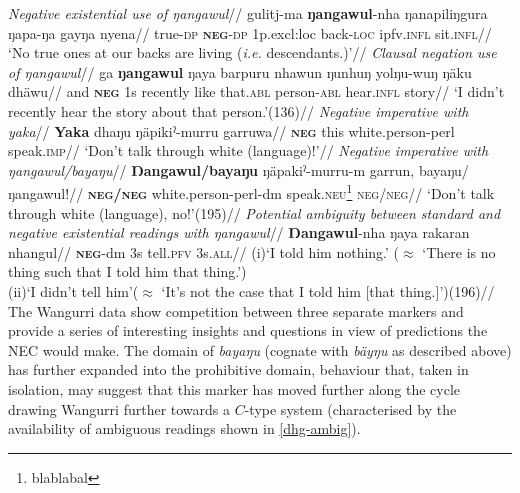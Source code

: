 \documentclass[usenames,dvipsnames,11pt]{article}
\begin{document}
{\pex\a\begingl\glpreamble \textit{Negative existential use of {\em ŋangawul}}//
\gla gulitj-ma \textbf{ŋangawul}-nha ŋanapiliŋgura ŋapa-ŋa gayŋa nyena//
\glb true-\textsc{dp} \textsc{\textbf{neg}-dp} 1\gls{p}.\gls{excl}{:loc} back\textsc{-loc} \gls{ipfv}.\textsc{infl} sit.\textsc{infl}//
\glft`No true ones at our backs are living (\textit{i.e.} descendants.)'//
\endgl
\a\begingl\glpreamble\textit{Clausal negation use of {\em ŋangawul}}//
\gla ga \textbf{ŋangawul} ŋaya barpuru nhawun ŋunhuŋ yolŋu-wuŋ ŋäku dhäwu//
\glb and \textsc{\textbf{neg}} \gls{1}s recently like that.\textsc{abl} person\textsc{-abl} hear\textsc{.infl} story//
\glft `I didn't recently hear the story about that person.'\trailingcitation(136)//
\endgl
\a\begingl\glpreamble\textit{Negative imperative with {\em yaka}}//
\gla \textbf{Yaka} dhaŋu ŋäpikiˀ-murru garruwa//
\glb \textsc{\textbf{neg}} this white.person-\gls{perl} speak\textsc{.imp}//
\glft`Don't talk through white (language)!'//
\endgl
\a\begingl\glpreamble\textit{Negative imperative with \emph{ŋangawul/bayaŋu}}//
\gla \textbf{Ŋangawul/bayaŋu} ŋäpakiˀ-murru-m garrun, bayaŋu/ŋangawul!//
\glb \textsc{\textbf{neg/neg}} white.person-\gls{perl}-\gls{dm} speak\textsc{.neu}\footnote{blablabal} \textsc{neg/neg}//
\glft `Don't talk through white (language), no!'\trailingcitation(195)//\endgl
\a\label{dhg-ambig}\begingl\glpreamble\textit{Potential ambiguity between standard and negative existential readings with \emph{ŋangawul}}//
\gla \textbf{Ŋangawul}-nha ŋaya rakaran nhangul//
\glb \textsc{\textbf{neg}}-\gls{dm} \gls{3}\gls{s} tell.\textsc{pfv} 3s.\textsc{all}//
\glft(i)\quad`I told him nothing.' ($\approx$ `There is no thing such that I told him that thing.')\\
(ii)\quad `I didn't tell him'($\approx$ `It's not the case that I told him [that thing.]')\trailingcitation(196)//\endgl
\xe
{}
The Wangurri data show competition between three separate markers and provide a series of interesting insights and questions in view of predictions the NEC would make. The domain of \textit{bayaŋu} (cognate with \textit{bäyŋu} as described above) has further expanded into the prohibitive domain, behaviour that, taken in isolation, may suggest that this marker has moved further along the cycle drawing Wangurri further towards a $C$-type system (characterised by the availability of ambiguous readings shown in \ref{dhg-ambig}).

}
\end{document}
